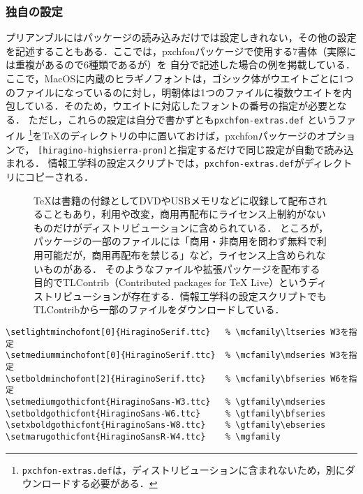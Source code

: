 \subsubsection{独自の設定}

プリアンブルにはパッケージの読み込みだけでは設定しきれない，その他の設定を記述することもある．ここでは，pxchfonパッケージで使用する7書体（実際には重複があるので6種類であるが）を
自分で記述した場合の例を掲載している．
ここで，MacOSに内蔵のヒラギノフォントは，ゴシック体がウエイトごとに1つのファイルになっているのに対し，明朝体は1つのファイルに複数ウエイトを内包している．そのため，ウエイトに対応したフォントの番号の指定が必要となる．
ただし，これらの設定は自分で書かずとも\texttt{pxchfon-extras.def} \cite{PXex}というファイル
\footnote{\texttt{pxchfon-extras.def}は，ディストリビューションに含まれないため，別にダウンロードする必要がある．}を{\TeX}のディレクトリの中に置いておけば，pxchfonパッケージのオプションで，
\texttt{[hiragino-highsierra-pron]}と指定するだけで同じ設定が自動で読み込まれる．
情報工学科の設定スクリプトでは，\texttt{pxchfon-extras.def}がディレクトリにコピーされる．
\begin{figure}[b]
\begin{itembox}[l]{}
\small\sffamily\mgfamily
{\TeX}は書籍の付録としてDVDやUSBメモリなどに収録して配布されることもあり，利用や改変，商用再配布にライセンス上制約がないものだけがディストリビューションに含められている．
ところが，パッケージの一部のファイルには「商用・非商用を問わず無料で利用可能だが，商用再配布を禁じる」など，ライセンス上含められないものがある．
そのようなファイルや拡張パッケージを配布する目的でTLContrib（Contributed packages for TeX Live）というディストリビューション\cite{tlcontrib}が存在する．情報工学科の設定スクリプトでもTLContribから一部のファイルをダウンロードしている．
\end{itembox}
\end{figure}

\begin{tcolorbox}[colback=blue!5!white,colframe=blue!70!black,breakable=true]
\begin{lstlisting}
\setlightminchofont[0]{HiraginoSerif.ttc}	% \mcfamily\ltseries W3を指定
\setmediumminchofont[0]{HiraginoSerif.ttc} 	% \mcfamily\mdseries W3を指定
\setboldminchofont[2]{HiraginoSerif.ttc}	% \mcfamily\bfseries W6を指定
\setmediumgothicfont{HiraginoSans-W3.ttc}	% \gtfamily\mdseries
\setboldgothicfont{HiraginoSans-W6.ttc}		% \gtfamily\bfseries
\setxboldgothicfont{HiraginoSans-W8.ttc}	% \gtfamily\ebseries
\setmarugothicfont{HiraginoSansR-W4.ttc}	% \mgfamily
\end{lstlisting}
\end{tcolorbox}

